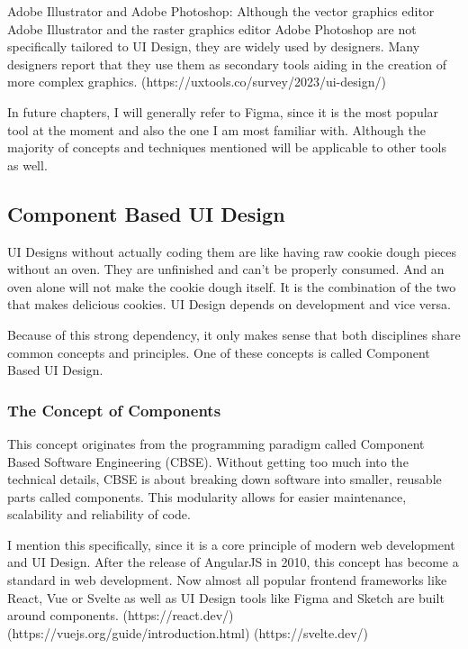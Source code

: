         Adobe Illustrator and Adobe Photoshop:
        Although the vector graphics editor Adobe Illustrator and the raster graphics editor Adobe Photoshop are not specifically tailored to UI Design, they are widely used by designers.
        Many designers report that they use them as secondary tools aiding in the creation of more complex graphics.
        (https://uxtools.co/survey/2023/ui-design/)

        In future chapters, I will generally refer to Figma, since it is the most popular tool at the moment and also the one I am most familiar with. Although the majority of concepts and techniques mentioned will be applicable to other tools as well.

    \subsection{Component Based UI Design}
    UI Designs without actually coding them are like having raw cookie dough pieces without an oven. They are unfinished and can't be properly consumed. 
    And an oven alone will not make the cookie dough itself. It is the combination of the two that makes delicious cookies. UI Design depends on development and vice versa.

    Because of this strong dependency, it only makes sense that both disciplines share common concepts and principles. One of these concepts is called Component Based UI Design.

    \subsubsection{The Concept of Components}
    This concept originates from the programming paradigm called Component Based Software Engineering (CBSE). Without getting too much into the technical details,
    CBSE is about breaking down software into smaller, reusable parts called components. This modularity allows for easier maintenance, scalability and reliability of code.
    
    I mention this specifically, since it is a core principle of modern web development and UI Design. 
    After the release of AngularJS in 2010, this concept has become a standard in web development. %
    Now almost all popular frontend frameworks like React, Vue or Svelte as well as UI Design tools like Figma and Sketch are built around components. (https://react.dev/) (https://vuejs.org/guide/introduction.html) (https://svelte.dev/)
    
